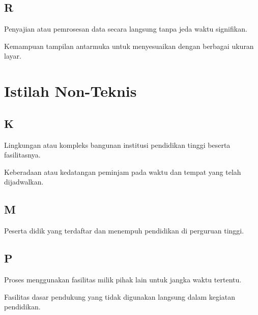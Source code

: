 \subsection*{R}
\begin{description}[leftmargin=3.5cm, style=sameline, font=\normalfont]
    \item[Realtime] Penyajian atau pemrosesan data secara langsung tanpa jeda waktu signifikan.
    \item[Responsive] Kemampuan tampilan antarmuka untuk menyesuaikan dengan berbagai ukuran layar.
\end{description}

\newpage

\section*{Istilah Non-Teknis}

\subsection*{K}
\begin{description}[leftmargin=3.5cm, style=sameline, font=\normalfont]
    \item[Kampus] Lingkungan atau kompleks bangunan institusi pendidikan tinggi beserta fasilitasnya.
    \item[Kehadiran] Keberadaan atau kedatangan peminjam pada waktu dan tempat yang telah dijadwalkan.
\end{description}

\subsection*{M}
\begin{description}[leftmargin=3.5cm, style=sameline, font=\normalfont]
    \item[Mahasiswa] Peserta didik yang terdaftar dan menempuh pendidikan di perguruan tinggi.
\end{description}

\subsection*{P}
\begin{description}[leftmargin=3.5cm, style=sameline, font=\normalfont]
    \item[Peminjaman] Proses menggunakan fasilitas milik pihak lain untuk jangka waktu tertentu.
    \item[Prasarana] Fasilitas dasar pendukung yang tidak digunakan langsung dalam kegiatan pendidikan.
\end{description}

